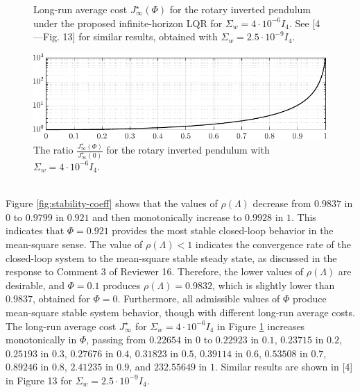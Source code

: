 {\begin{figure}[h!]
\begin{center}
\caption{Long-run average cost $J_{\infty}^{\star}(\mathit{\Phi})$ for the rotary inverted pendulum under the proposed infinite-horizon LQR for $\Sigma_{w}=4\cdot 10^{-6} I_4$. See [4—Fig. 13] for similar results, obtained with $\Sigma_{w}=2.5\cdot 10^{-9} I_4$.}\label{fig:cost-coeff}
\end{center}
\end{figure}
\begin{figure}[h!]
\begin{center}
\includegraphics[width=0.7\columnwidth]{cost-ratio-2.pdf}
\caption{The ratio $\frac{J_{\infty}^{\star}(\mathit{\Phi})}{J_{\infty}^{\star}(\mathit{0})}$ for the rotary inverted pendulum with $\Sigma_{w}=4\cdot 10^{-6} I_4$.}\label{fig:cost-ratio}
\end{center}
\end{figure}\\[-4mm]
Figure \ref{fig:stability-coeff} shows that the values of $\rho(\Lambda)$ decrease from $0.9837$ in $0$ to $0.9799$ in $0.921$ and then monotonically increase to $0.9928$ in $1$. This indicates that $\mathit{\Phi} = 0.921$ provides the most stable closed-loop behavior in the mean-square sense. The value of $\rho(\Lambda)<1$ indicates the convergence rate of the closed-loop system to the mean-square stable steady state, as discussed in the response to Comment 3 of Reviewer 16. Therefore, the lower values of $\rho(\Lambda)$ are desirable, and $\mathit{\Phi} = 0.1$ produces $\rho(\Lambda)=0.9832$, which is slightly lower than $0.9837$, obtained for $\mathit{\Phi} = 0$. Furthermore, all admissible values of $\mathit{\Phi}$ produce mean-square stable system behavior, though with different long-run average costs.\\
The long-run average cost $J_{\infty}^{\star}$ for $\Sigma_{w}=4\cdot 10^{-6} I_4$ in Figure \ref{fig:cost-coeff} increases monotonically in $\mathit{\Phi}$, passing from $0.22654$ in $0$ to $0.22923$ in $0.1$, $0.23715$ in $0.2$, $0.25193$ in $0.3$, $0.27676$ in $0.4$,
$0.31823$ in $0.5$, $0.39114$ in $0.6$, $0.53508$ in $0.7$, $0.89246$ in $0.8$, 
$2.41235$ in $0.9$, and $232.55649$ in $1$. Similar results are shown in [4] in Figure 13 for $\Sigma_{w}=2.5\cdot 10^{-9} I_4$. \\
}
